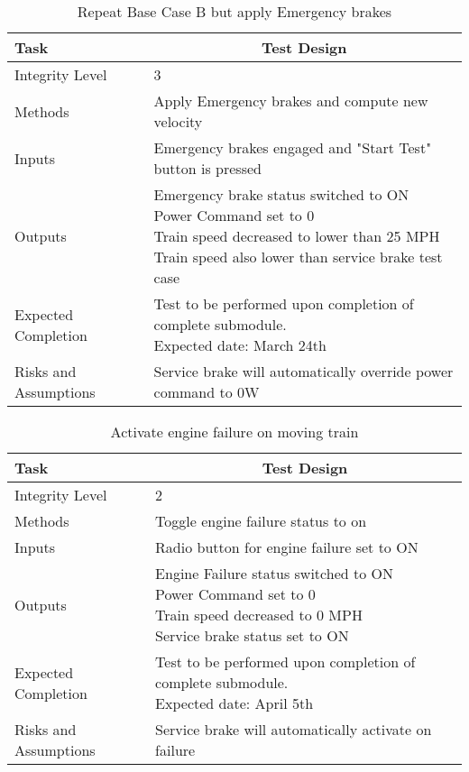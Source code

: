 \documentclass[]{article}
\begin{document}
	\begin{table}[H]
		\centering
		\caption{Repeat Base Case B but apply Emergency brakes}
		\begin{tabular}{|l|l|}
			\hline
			Task & \multicolumn{1}{c|}{Test Design} \\ \hline
			Integrity Level & 3 \\ \hline
			Methods & Apply Emergency brakes and compute new velocity  \\ \hline
			Inputs &  Emergency brakes engaged and "Start Test" button is pressed \\ \hline
			Outputs & \parbox[t]{10cm}{ Emergency brake status switched to ON\\ Power Command set to 0\\ Train speed decreased to lower than 25 MPH\\ Train speed also lower than service brake test case  }\\ \hline
			Expected Completion & \parbox[t]{10cm}{Test to be performed upon completion of complete submodule.\\ Expected date: March 24th}\\ \hline
			Risks and Assumptions & Service brake will automatically override power command to 0W\\ \hline
		\end{tabular}
	\end{table}

	\begin{table}[H]
		\centering
		\caption{Activate engine failure on moving train}
		\begin{tabular}{|l|l|}
			\hline
			Task & \multicolumn{1}{c|}{Test Design} \\ \hline
			Integrity Level & 2 \\ \hline
			Methods & Toggle engine failure status to on  \\ \hline
			Inputs &  Radio button for engine failure set to ON \\ \hline
			Outputs & \parbox[t]{10cm}{ Engine Failure status switched to ON\\ Power Command set to 0\\ Train speed decreased to 0 MPH\\ Service brake status set to ON  }\\ \hline
			Expected Completion & \parbox[t]{10cm}{Test to be performed upon completion of complete submodule.\\ Expected date: April 5th}\\ \hline
			Risks and Assumptions & Service brake will automatically activate on failure\\ \hline
		\end{tabular}
	\end{table}
\end{document}
